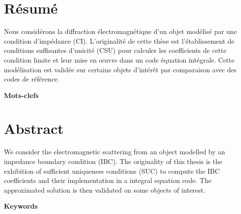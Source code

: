 \thispagestyle{empty}
\begin{center}
\Large
\textbf{\doctitlefr}
\end{center}
\section*{Résumé}
Nous considérons la diffraction électromagnétique d'un objet modélisé par une condition d'impédance (CI). L'originalité de cette thèse est l'établissement de conditions suffisantes d'unicité (CSU) pour calculer les coefficients de cette condition limite et leur mise en œuvre dans un code équation intégrale. Cette modélisation est validée sur certains objets d'intérêt par comparaison avec des codes de référence.

\textbf{Mots-clefs}
\dockeywordsfr

\hrulefill
\begin{center}
\Large
\textbf{\doctitleeng}
\end{center}
\section*{Abstract}
We consider the electromagnetic scattering from an object modelled by an impedance boundary condition (IBC). The originality of this thesis is the exhibition of sufficient uniqueness conditions (SUC) to compute the IBC coefficients and their implementation in a integral equation code. The approximated solution is then validated on some objects of interest.

\textbf{Keywords}
\dockeywordseng
